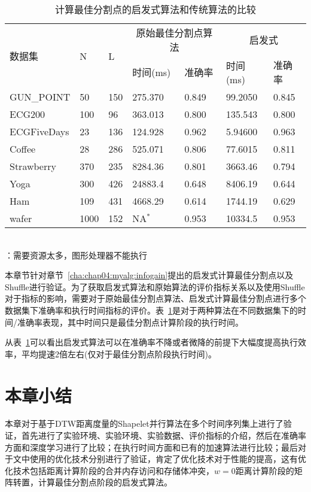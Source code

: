 \begin{table}[htbp]
	\centering
	\begin{minipage}{0.95\textwidth}
		\caption{计算最佳分割点的启发式算法和传统算法的比较}
		\label{tab:ShuffleWork}
		\begin{tabular}{p{2cm}p{1cm}p{1cm}p{2cm}p{2cm}p{1.5cm}p{1.5cm}}
			\toprule[1.5pt]
			\multirow{2}{*}{{\heiti 数据集}} 
			& \multirow{2}{*}{{\heiti N}} 
			& \multirow{2}{*}{{\heiti L}}
			& \multicolumn{2}{c}{{\heiti 原始最佳分割点算法 }} & \multicolumn{2}{c}{{\heiti  启发式 }}  \\ \cmidrule[1.2pt]{4-7}
			&&& 时间(ms)         & 准确率         & 时间(ms)         & 准确率      
			\\\midrule[1pt]
			GUN\_POINT & 50 & 150 & 275.370 & 0.849 & 99.2050 & 0.845\\
			ECG200 &100 &96 & 363.013 & 0.800 & 135.543 & 0.800\\
			ECGFiveDays & 23 & 136 & 124.928 & 0.962 & 5.94600 & 0.963\\
			Coffee & 28 &286 & 525.071 & 0.806 & 77.6015 & 0.811\\
			Strawberry &370  & 235& 8284.36 & 0.801 & 3663.46 & 0.794\\
			Yoga & 300 & 426 & 24883.4 & 0.648 & 8406.19 & 0.644\\
			Ham &109 &431& 4668.29 & 0.614 & 1744.19 & 0.629\\
			wafer &1000 &152 & NA$^*$ & 0.953 & 10334.5 & 0.953\\
			\bottomrule[1.5pt]
		\end{tabular}\\
		\footnotesize *：需要资源太多，图形处理器不能执行 \\
	\end{minipage}
\end{table}

本章节针对章节~\ref{cha:chap04:myalg:infogain}提出的启发式计算最佳分割点以及Shuffle进行验证。为了获取启发式算法和原始算法的评价指标关系以及使用Shuffle对于指标的影响，需要对于原始最佳分割点算法、启发式计算最佳分割点进行多个数据集下准确率和执行时间指标的评价。表~\ref{tab:ShuffleWork}是对于两种算法在不同数据集下的时间/准确率表现，其中时间只是最佳分割点计算阶段的执行时间。

从表~\ref{tab:ShuffleWork}可以看出启发式算法可以在准确率不降或者微降的前提下大幅度提高执行效率，平均提速2倍左右(仅对于最佳分割点阶段执行时间)。

\section{本章小结}

本章对于基于DTW距离度量的Shapelet并行算法在多个时间序列集上进行了验证，首先进行了实验环境、实验环境、实验数据、评价指标的介绍，然后在准确率方面和深度学习进行了比较；在执行时间方面和已有的加速算法进行比较；最后对于文中使用的优化技术分别进行了验证，肯定了优化技术对于性能的提高，这有优化技术包括距离计算阶段的合并内存访问和存储体冲突，$w=0$距离计算阶段的矩阵转置，计算最佳分割点阶段的启发式算法。
